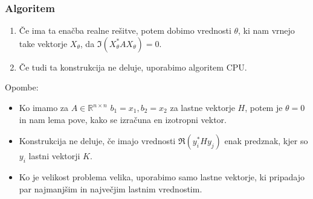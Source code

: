 \documentclass{beamer}
\newcommand{\R}{\mathbb R}
\newcounter{saveenumi}
\newcommand{\conti}{\setcounter{enumi}{\value{saveenumi}}}
\begin{document}
\begin{frame}
\frametitle{Algoritem}
\begin{enumerate}[1.]
\conti
\item Če ima ta enačba realne rešitve, potem dobimo vrednosti $\theta$, ki nam vrnejo take vektorje $X_\theta$, da $\Im(X_\theta ^\ast AX_\theta)=0$.\medskip
\item Če tudi ta konstrukcija ne deluje, uporabimo algoritem CPU.
\end{enumerate}
Opombe:
\begin{itemize}
\item  Ko imamo za $A\in \R^{n\times n}$ $b_1=x_1, b_2=x_2$ za lastne vektorje $H$, potem je $\theta=0$ in nam lema pove, kako se izračuna en izotropni vektor.
\item Konstrukcija ne deluje, če imajo vrednosti $\Re(y_i^\ast Hy_j)$ enak predznak, kjer so $y_i$ lastni vektorji $K.$
\item Ko je velikost problema velika, uporabimo samo lastne vektorje, ki pripadajo par najmanjšim in največjim lastnim vrednostim.
\end{itemize}
\end{frame}
\end{document}
